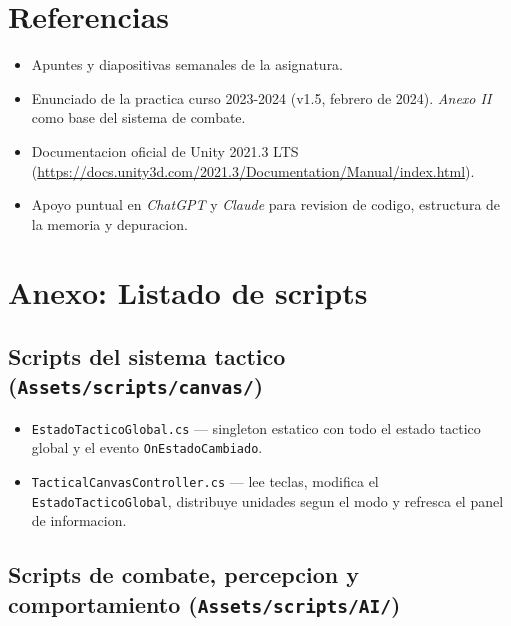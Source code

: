 \documentclass[12pt,a4paper]{article}
\begin{document}
\newpage
\section{Referencias}

\begin{itemize}[leftmargin=1.5em]
    \item Apuntes y diapositivas semanales de la asignatura.
    \item Enunciado de la practica curso 2023-2024 (v1.5, febrero de 2024). \emph{Anexo II} como base del sistema de combate.
    \item Documentacion oficial de Unity 2021.3 LTS \\(\url{https://docs.unity3d.com/2021.3/Documentation/Manual/index.html}).
    \item Apoyo puntual en \textit{ChatGPT} y \textit{Claude} para revision de codigo, estructura de la memoria y depuracion.
\end{itemize}

\newpage
\appendix
\section{Anexo: Listado de scripts}

\subsection*{Scripts del sistema tactico (\texttt{Assets/scripts/canvas/})}

\begin{itemize}[leftmargin=1.5em]
    \item \texttt{EstadoTacticoGlobal.cs} — singleton estatico con todo el estado tactico global y el evento \texttt{OnEstadoCambiado}.
    \item \texttt{TacticalCanvasController.cs} — lee teclas, modifica el \texttt{EstadoTacticoGlobal}, distribuye unidades segun el modo y refresca el panel de informacion.
\end{itemize}

\subsection*{Scripts de combate, percepcion y comportamiento (\texttt{Assets/scripts/AI/})}
\end{document}
